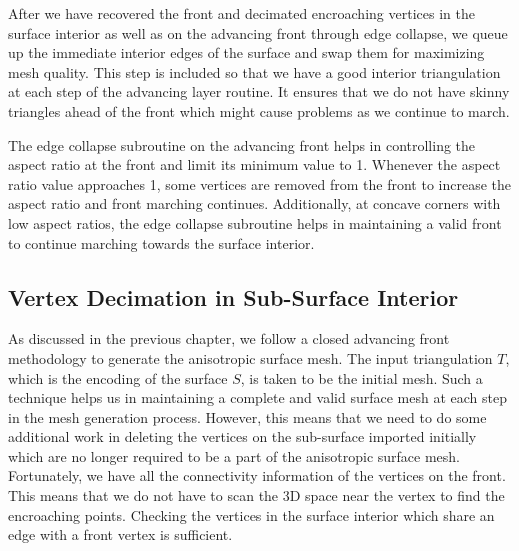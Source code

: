 After we have recovered the front and decimated encroaching vertices in the surface interior as well as on the advancing front through edge collapse, we queue up the immediate interior edges of the surface and swap them for maximizing mesh quality. This step is included so that we have a good interior triangulation at each step of the advancing layer routine. It ensures that we do not have skinny triangles ahead of the front which might cause problems as we continue to march.

The edge collapse subroutine on the advancing front helps in controlling the aspect ratio at the front and limit its minimum value to 1. Whenever the aspect ratio value approaches 1, some vertices are removed from the front to increase the aspect ratio and front marching continues. Additionally, at concave corners with low aspect ratios, the edge collapse subroutine helps in maintaining a valid front to continue marching towards the surface interior.

\subsection{Vertex Decimation in Sub-Surface Interior}

As discussed in the previous chapter, we follow a closed advancing front methodology to generate the anisotropic surface mesh. The input triangulation $T$, which is the encoding of the surface $S$, is taken to be the initial mesh. Such a technique helps us in maintaining a complete and valid surface mesh at each step in the mesh generation process. However, this means that we need to do some additional work in deleting the vertices on the sub-surface imported initially which are no longer required to be a part of the anisotropic surface mesh. Fortunately, we have all the connectivity information of the vertices on the front. This means that we do not have to scan the 3D space near the vertex to find the encroaching points. Checking the vertices in the surface interior which share an edge with a front vertex is sufficient.

